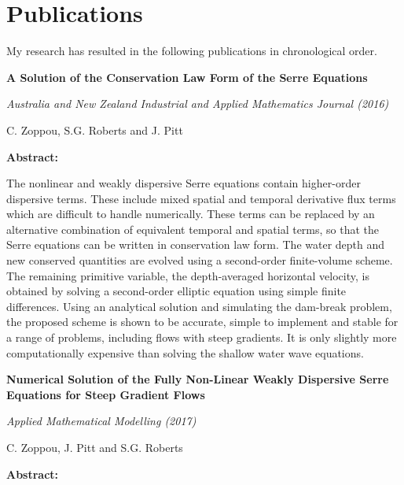 \chapter{Publications}
\label{app:Pub}
My research has resulted in the following publications in chronological order.

\begin{center}
\textbf{
	\Large A Solution of the Conservation Law Form of the Serre Equations}

\vspace*{\baselineskip}

\textit{Australia and New Zealand Industrial and Applied Mathematics Journal (2016)}

{C. Zoppou, S.G. Roberts and J. Pitt}
\vspace*{0.5\baselineskip}
\end{center}
\textbf{Abstract:}

The nonlinear and weakly dispersive Serre equations contain higher-order dispersive terms. These include mixed spatial and temporal derivative flux terms which are difficult to handle numerically. These terms can be replaced by an alternative combination of equivalent temporal and spatial terms, so that the Serre equations can be written in conservation law form. The water depth and new conserved quantities are evolved using a second-order finite-volume scheme. The remaining primitive variable, the depth-averaged horizontal velocity, is obtained by solving a second-order elliptic equation using simple finite differences. Using an analytical solution and simulating the dam-break problem, the proposed scheme is shown to be accurate, simple to implement and stable for a range of problems, including flows with steep gradients. It is only slightly more computationally expensive than solving the shallow water wave equations. 
\newline


\newpage


\begin{center}
	\textbf{
		\Large Numerical Solution of the Fully Non-Linear Weakly Dispersive
		Serre Equations for Steep Gradient Flows}
	
	\vspace*{\baselineskip}
	
	\textit{Applied Mathematical Modelling (2017)}
	
	{C. Zoppou, J. Pitt and S.G. Roberts}
	\vspace*{0.5\baselineskip}
\end{center}
\textbf{Abstract:}

